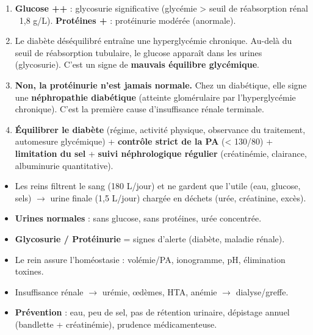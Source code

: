 \documentclass[11pt]{article}
\begin{document}
\begin{corrige}
\begin{enumerate}
    \item \textbf{Glucose ++} : glycosurie significative (glycémie > seuil de réabsorption rénal ~1,8 g/L). \textbf{Protéines +} : protéinurie modérée (anormale).
    \item Le diabète déséquilibré entraîne une hyperglycémie chronique. Au-delà du seuil de réabsorption tubulaire, le glucose apparaît dans les urines (glycosurie). C'est un signe de \textbf{mauvais équilibre glycémique}.
    \item \textbf{Non, la protéinurie n'est jamais normale.} Chez un diabétique, elle signe une \textbf{néphropathie diabétique} (atteinte glomérulaire par l'hyperglycémie chronique). C'est la première cause d'insuffisance rénale terminale.
    \item \textbf{Équilibrer le diabète} (régime, activité physique, observance du traitement, automesure glycémique) + \textbf{contrôle strict de la PA} (< 130/80) + \textbf{limitation du sel} + \textbf{suivi néphrologique régulier} (créatinémie, clairance, albuminurie quantitative).
\end{enumerate}
\end{corrige}

\begin{aretenir}
\begin{itemize}
    \item Les reins filtrent le sang (180 L/jour) et ne gardent que l'utile (eau, glucose, sels) $\rightarrow$ urine finale (1,5 L/jour) chargée en déchets (urée, créatinine, excès).
    \item \textbf{Urines normales} : sans glucose, sans protéines, urée concentrée.
    \item \textbf{Glycosurie / Protéinurie} = signes d'alerte (diabète, maladie rénale).
    \item Le rein assure l'homéostasie : volémie/PA, ionogramme, pH, élimination toxines.
    \item Insuffisance rénale $\rightarrow$ urémie, œdèmes, HTA, anémie $\rightarrow$ dialyse/greffe.
    \item \textbf{Prévention} : eau, peu de sel, pas de rétention urinaire, dépistage annuel (bandlette + créatinémie), prudence médicamenteuse.
\end{itemize}
\end{aretenir}
\end{document}
